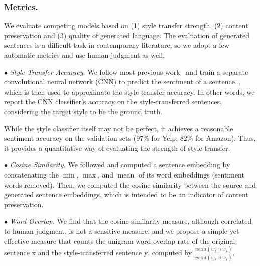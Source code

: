 \documentclass[letterpaper]{article} %
\begin{document}
\subsubsection{Metrics.} We evaluate competing models based on (1) style transfer strength, (2) content preservation and (3) quality of generated language. The evaluation of generated sentences is a difficult task in contemporary literature, so we adopt a few automatic metrics and use human judgment as well.

$\bullet$ \textit{Style-Transfer Accuracy.} We follow most previous work~\cite{hu2017toward,shen2017style,fu2018style} and train a separate convolutional neural network (CNN)  to predict the sentiment of a sentence~\cite{kim2014convolutional}, which is then used to approximate the style transfer accuracy. In other words, we report the CNN classifier's accuracy on the style-transferred sentences, considering the target style to be the ground truth.

While the style classifier itself may not be perfect, it achieves a reasonable sentiment accuracy on the validation sets ($97\%$ for Yelp; $82\%$ for Amazon). Thus, it provides a quantitative way of evaluating the strength of style-transfer.

$\bullet$ \textit{Cosine Similarity.}
We followed \citet{fu2018style} and computed a sentence embedding by concatenating the $\operatorname{min}$, $\operatorname{max}$, and $\operatorname{mean}$ of its word embeddings (sentiment words removed).
Then, we computed the cosine similarity between the source and generated sentence embeddings, which is intended to be an indicator of content preservation.

$\bullet$ \textit{Word Overlap.} We find that the cosine similarity measure, although correlated to human judgment, is not a sensitive measure, and we propose a simple yet effective measure that counts the unigram word overlap rate of the original sentence $\mathrm x$ and the style-transferred sentence $\mathrm y$, computed by $\frac{count(w_{\mathrm x} \cap w_{\mathrm y})}{count(w_{\mathrm x} \cup w_{\mathrm y})}$.

\end{document}
